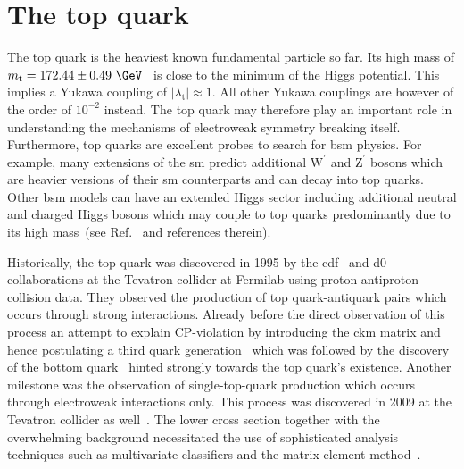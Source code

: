 \chapter{The top quark}
\label{ch:top}


The top quark is the heaviest known fundamental particle so far. Its high mass of $m_\mathrm{t}=172.44\pm0.49~\GeV$~\cite{Khachatryan:2015hba} is close to the minimum of the Higgs potential. This implies a Yukawa coupling of $|\lambda_\mathrm{t}|\approx 1$. All other Yukawa couplings are however of the order of $10^{-2}$ instead. The top quark may therefore play an important role in understanding the mechanisms of electroweak symmetry breaking itself. Furthermore, top quarks are excellent probes to search for \gls{bsm} physics. For example, many extensions of the \gls{sm} predict additional $\mathrm{W}^{\prime}$ and $\mathrm{Z}^{\prime}$ bosons which are heavier versions of their \gls{sm} counterparts and can decay into top quarks. Other \gls{bsm} models can have an extended Higgs sector including additional neutral and charged Higgs bosons which may couple to top quarks predominantly due to its high mass~(see Ref.~\cite{Boos:2006xe} and references therein).

Historically, the top quark was discovered in 1995 by the \gls{cdf}~\cite{Abe:1995hr} and \gls{d0}~\cite{Abachi:1994td} collaborations at the Tevatron collider at Fermilab using proton-antiproton collision data. They observed the production of top quark-antiquark pairs which occurs through strong interactions. Already before the direct observation of this process an attempt to explain CP-violation by introducing the \gls{ckm} matrix and hence postulating a third quark generation~\cite{Kobayashi01021973} which was followed by the discovery of the bottom quark~\cite{Augustin:1975yq,PhysRevLett.39.252} hinted strongly towards the top quark's existence. Another milestone was the observation of single-top-quark production which occurs through electroweak interactions only. This process was discovered in 2009 at the Tevatron collider as well~\cite{PhysRevLett.103.092002,PhysRevLett.103.092001}. The lower cross section together with the overwhelming background necessitated the use of sophisticated analysis techniques such as multivariate classifiers and the matrix element method~\cite{Mitrevski}.

